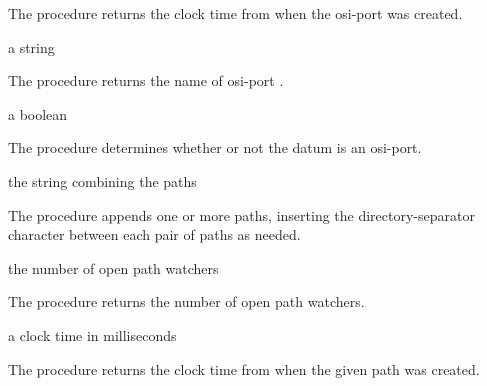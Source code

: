 The  procedure returns the clock time from
 when the osi-port  was created.

\begin{procedure}
\end{procedure}
\returns{} a string

The  procedure returns the name of osi-port
.

\begin{procedure}
\end{procedure}
\returns{} a boolean

The  procedure determines whether or not the datum
 is an osi-port.

\begin{procedure}
\end{procedure}
\returns{} the string combining the paths

The  procedure appends one or more paths, inserting
the directory-separator character between each pair of paths as
needed.

\begin{procedure}
\end{procedure}
\returns{} the number of open path watchers

The  procedure returns the number of open
path watchers.

\begin{procedure}
\end{procedure}
\returns{} a clock time in milliseconds

The  procedure returns the clock time
from  when the given path  was created.

